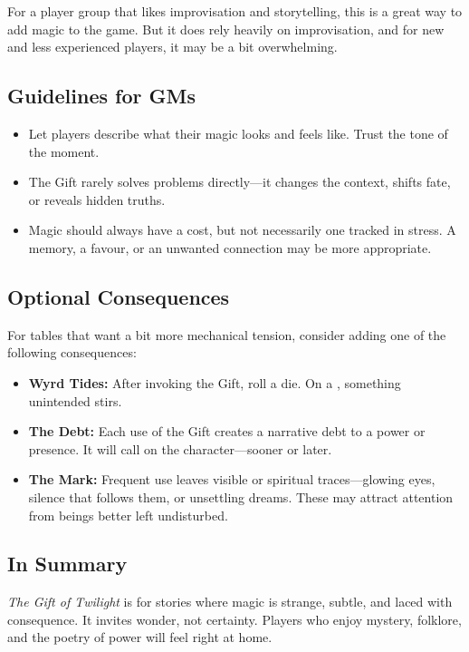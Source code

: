 For a player group that likes improvisation and storytelling, this is a great way to add magic to the game. But it does rely heavily on improvisation, and for new and less experienced players, it may be a bit overwhelming.

\subsection{Guidelines for GMs}

\begin{itemize}
    \item Let players describe what their magic looks and feels like. Trust the tone of the moment.
    \item The Gift rarely solves problems directly—it changes the context, shifts fate, or reveals hidden truths.
    \item Magic should always have a cost, but not necessarily one tracked in stress. A memory, a favour, or an unwanted connection may be more appropriate.
\end{itemize}

\subsection{Optional Consequences}

For tables that want a bit more mechanical tension, consider adding one of the following consequences:

\begin{itemize}
    \item \textbf{Wyrd Tides:} After invoking the Gift, roll a die. On a \FudgeDie{-}, something unintended stirs.
    \item \textbf{The Debt:} Each use of the Gift creates a narrative debt to a power or presence. It will call on the character—sooner or later.
    \item \textbf{The Mark:} Frequent use leaves visible or spiritual traces—glowing eyes, silence that follows them, or unsettling dreams. These may attract attention from beings better left undisturbed.
\end{itemize}

\subsection{In Summary}

\textit{The Gift of Twilight} is for stories where magic is strange, subtle, and laced with consequence. It invites wonder, not certainty. Players who enjoy mystery, folklore, and the poetry of power will feel right at home.
